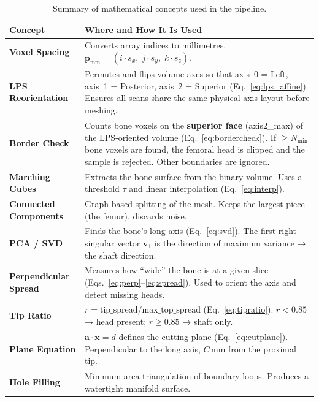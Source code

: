 \documentclass[12pt,a4paper]{article}
\begin{document}
\begin{table}[H]
\centering
\renewcommand{\arraystretch}{1.4}
\caption{Summary of mathematical concepts used in the pipeline.}
\begin{tabular}{@{}p{3.5cm}p{10cm}@{}}
\toprule
\textbf{Concept} & \textbf{Where and How It Is Used} \\
\midrule
\textbf{Voxel Spacing} &
    Converts array indices to millimetres.
    $\mathbf{p}_{\text{mm}} = (i \cdot s_x,\; j \cdot s_y,\; k \cdot s_z)$. \\

\textbf{LPS Reorientation} &
    Permutes and flips volume axes so that axis~0 = Left, axis~1 = Posterior,
    axis~2 = Superior (Eq.~\ref{eq:lps_affine}).  Ensures all scans share
    the same physical axis layout before meshing. \\

\textbf{Border Check} &
    Counts bone voxels on the \textbf{superior face} (axis2\_max) of the
    LPS-oriented volume (Eq.~\ref{eq:bordercheck}).
    If $\geq N_{\min}$ bone voxels are found, the femoral head is clipped
    and the sample is rejected.  Other boundaries are ignored. \\

\textbf{Marching Cubes} &
    Extracts the bone surface from the binary volume.
    Uses a threshold $\tau$ and linear interpolation
    (Eq.~\ref{eq:interp}). \\

\textbf{Connected Components} &
    Graph-based splitting of the mesh.
    Keeps the largest piece (the femur), discards noise. \\

\textbf{PCA / SVD} &
    Finds the bone's long axis (Eq.~\ref{eq:svd}).
    The first right singular vector $\mathbf{v}_1$ is the direction
    of maximum variance → the shaft direction. \\

\textbf{Perpendicular Spread} &
    Measures how ``wide'' the bone is at a given slice
    (Eqs.~\ref{eq:perp}--\ref{eq:spread}).
    Used to orient the axis and detect missing heads. \\

\textbf{Tip Ratio} &
    $r = \text{tip\_spread} / \text{max\_top\_spread}$
    (Eq.~\ref{eq:tipratio}).
    $r < 0.85$ → head present; $r \geq 0.85$ → shaft only. \\

\textbf{Plane Equation} &
    $\mathbf{a} \cdot \mathbf{x} = d$ defines the cutting plane
    (Eq.~\ref{eq:cutplane}).
    Perpendicular to the long axis, $C$\,mm from the proximal tip. \\

\textbf{Hole Filling} &
    Minimum-area triangulation of boundary loops.
    Produces a watertight manifold surface. \\
\bottomrule
\end{tabular}
\end{table}
\end{document}

